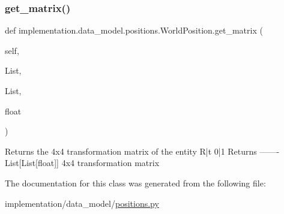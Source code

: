 \subsubsection{\texorpdfstring{get\+\_\+matrix()}{get\_matrix()}}
{\footnotesize\ttfamily def implementation.\+data\+\_\+model.\+positions.\+World\+Position.\+get\+\_\+matrix (\begin{DoxyParamCaption}\item[{}]{self,  }\item[{}]{List,  }\item[{}]{List,  }\item[{}]{float }\end{DoxyParamCaption})}

\begin{DoxyVerb}Returns the 4x4 transformation matrix of the entity
R|t
0|1
Returns
-------
List[List[float]]
    4x4 transformation matrix
\end{DoxyVerb}
 

The documentation for this class was generated from the following file\+:\begin{DoxyCompactItemize}
\item 
implementation/data\+\_\+model/\hyperlink{positions_8py}{positions.\+py}\end{DoxyCompactItemize}
